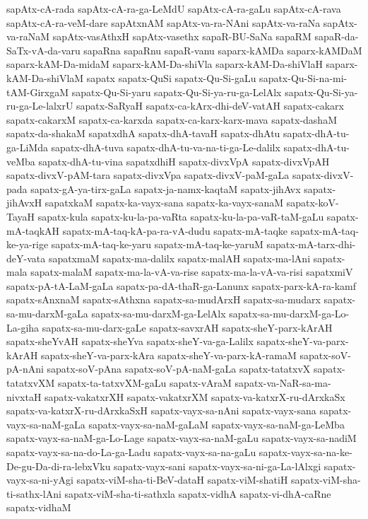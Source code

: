 {sapAtx-cA-rada
sapAtx-cA-ra-ga-LeMdU
sapAtx-cA-ra-gaLu
sapAtx-cA-rava
sapAtx-cA-ra-veM-dare
sapAtxnAM
sapAtx-va-ra-NAni
sapAtx-va-raNa
sapAtx-va-raNaM
sapAtx-vasAthxH
sapAtx-vasethx
sapaR-BU-SaNa
sapaRM
sapaR-da-SaTx-vA-da-varu
sapaRna
sapaRnu
sapaR-vanu
saparx-kAMDa
saparx-kAMDaM
saparx-kAM-Da-midaM
saparx-kAM-Da-shiVla
saparx-kAM-Da-shiVlaH
saparx-kAM-Da-shiVlaM
sapatx
sapatx-QuSi
sapatx-Qu-Si-gaLu
sapatx-Qu-Si-na-mi-tAM-GirxgaM
sapatx-Qu-Si-yaru
sapatx-Qu-Si-ya-ru-ga-LelAlx
sapatx-Qu-Si-ya-ru-ga-Le-lalxrU
sapatx-SaRyaH
sapatx-ca-kArx-dhi-deV-vatAH
sapatx-cakarx
sapatx-cakarxM
sapatx-ca-karxda
sapatx-ca-karx-karx-mava
sapatx-dashaM
sapatx-da-shakaM
sapatxdhA
sapatx-dhA-tavaH
sapatx-dhAtu
sapatx-dhA-tu-ga-LiMda
sapatx-dhA-tuva
sapatx-dhA-tu-va-na-ti-ga-Le-dalilx
sapatx-dhA-tu-veMba
sapatx-dhA-tu-vina
sapatxdhiH
sapatx-divxVpA
sapatx-divxVpAH
sapatx-divxV-pAM-tara
sapatx-divxVpa
sapatx-divxV-paM-gaLa
sapatx-divxV-pada
sapatx-gA-ya-tirx-gaLa
sapatx-ja-namx-kaqtaM
sapatx-jihAvx
sapatx-jihAvxH
sapatxkaM
sapatx-ka-vayx-sana
sapatx-ka-vayx-sanaM
sapatx-koV-TayaH
sapatx-kula
sapatx-ku-la-pa-vaRta
sapatx-ku-la-pa-vaR-taM-gaLu
sapatx-mA-taqkAH
sapatx-mA-taq-kA-pa-ra-vA-dudu
sapatx-mA-taqke
sapatx-mA-taq-ke-ya-rige
sapatx-mA-taq-ke-yaru
sapatx-mA-taq-ke-yaruM
sapatx-mA-tarx-dhi-deY-vata
sapatxmaM
sapatx-ma-dalilx
sapatx-malAH
sapatx-ma-lAni
sapatx-mala
sapatx-malaM
sapatx-ma-la-vA-va-rise
sapatx-ma-la-vA-va-risi
sapatxmiV
sapatx-pA-tA-LaM-gaLa
sapatx-pa-dA-thaR-ga-Lanunx
sapatx-parx-kA-ra-kamf
sapatx-sAnxnaM
sapatx-sAthxna
sapatx-sa-mudArxH
sapatx-sa-mudarx
sapatx-sa-mu-darxM-gaLa
sapatx-sa-mu-darxM-ga-LelAlx
sapatx-sa-mu-darxM-ga-Lo-La-giha
sapatx-sa-mu-darx-gaLe
sapatx-savxrAH
sapatx-sheY-parx-kArAH
sapatx-sheYvAH
sapatx-sheYva
sapatx-sheY-va-ga-Lalilx
sapatx-sheY-va-parx-kArAH
sapatx-sheY-va-parx-kAra
sapatx-sheY-va-parx-kA-ramaM
sapatx-soV-pA-nAni
sapatx-soV-pAna
sapatx-soV-pA-naM-gaLa
sapatx-tatatxvX
sapatx-tatatxvXM
sapatx-ta-tatxvXM-gaLu
sapatx-vAraM
sapatx-va-NaR-sa-ma-nivxtaH
sapatx-vakatxrXH
sapatx-vakatxrXM
sapatx-va-katxrX-ru-dArxkaSx
sapatx-va-katxrX-ru-dArxkaSxH
sapatx-vayx-sa-nAni
sapatx-vayx-sana
sapatx-vayx-sa-naM-gaLa
sapatx-vayx-sa-naM-gaLaM
sapatx-vayx-sa-naM-ga-LeMba
sapatx-vayx-sa-naM-ga-Lo-Lage
sapatx-vayx-sa-naM-gaLu
sapatx-vayx-sa-nadiM
sapatx-vayx-sa-na-do-La-ga-Ladu
sapatx-vayx-sa-na-gaLu
sapatx-vayx-sa-na-ke-De-gu-Da-di-ra-lebxVku
sapatx-vayx-sani
sapatx-vayx-sa-ni-ga-La-lAlxgi
sapatx-vayx-sa-ni-yAgi
sapatx-viM-sha-ti-BeV-dataH
sapatx-viM-shatiH
sapatx-viM-sha-ti-sathx-lAni
sapatx-viM-sha-ti-sathxla
sapatx-vidhA
sapatx-vi-dhA-caRne
sapatx-vidhaM
}
